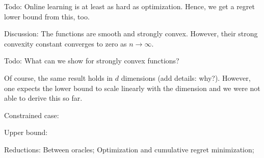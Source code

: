 Todo: Online learning is at least as hard as optimization. Hence, we get a regret lower bound from this, too.

Discussion: The functions are smooth and strongly convex.
However, their strong convexity constant converges to zero as $n\to\infty$.

Todo: What can we show for strongly convex functions?

Of course, the same result holds in $d$ dimensions (add details: why?). However, one expects the lower bound to scale linearly with the dimension and we were not able to derive this so far.

Constrained case:

Upper bound: 

Reductions:
Between oracles;
Optimization and cumulative regret minimization;


